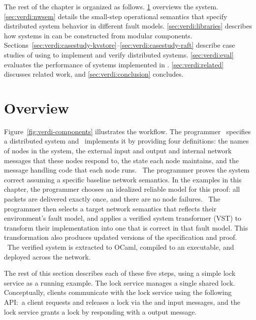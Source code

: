 The rest of the chapter is organized as follows.
%
\cref{sec:verdi:overview} overviews the \Verdi system.
%
\cref{sec:verdi:nwsem} details the small-step operational semantics that
specify distributed system behavior in different fault models.
%
\cref{sec:verdi:libraries} describes how systems in \Verdi can
be constructed from modular components.
%
Sections~\ref{sec:verdi:casestudy-kvstore}--\ref{sec:verdi:casestudy-raft} describe
case studies of using \Verdi to implement and verify distributed systems.
%
\cref{sec:verdi:eval} evaluates the performance of systems implemented in
\Verdi.
%
\cref{sec:verdi:related} discusses related work, and \cref{sec:verdi:conclusion}
concludes.


\section{Overview}
\label{sec:verdi:overview}

Figure~\ref{fig:verdi-components} illustrates the \Verdi workflow.
%
The programmer ~specifies a distributed system and
~implements it by providing four definitions: the names
of nodes in the system, the external input and output and internal
network messages that these nodes respond to, the state each node
maintains, and the message handling code that each node runs.
%
~The programmer proves the system correct assuming a
specific baseline network semantics. In the examples in this chapter,
the programmer chooses an idealized reliable model for this proof:
all packets are delivered exactly once, and there are no node failures.
%
~The programmer then selects a target network semantics
that reflects their environment's fault model, and applies a
verified system transformer
(VST) to transform their implementation into one that is correct in
that fault model.  This transformation also produces updated
versions of the specification and proof.
%
~The verified system is extracted to OCaml, compiled to an
executable, and deployed across the network.

The rest of this section describes each of these five steps, using a simple
lock service as a running example.
%
The lock service manages a single shared lock.
%
Conceptually, clients communicate with the lock service using the following
API:\ a client requests and releases a lock via the \LockIO and \UnlockIO
input messages, and the lock service grants a lock by responding with a
\GrantIO output message.


